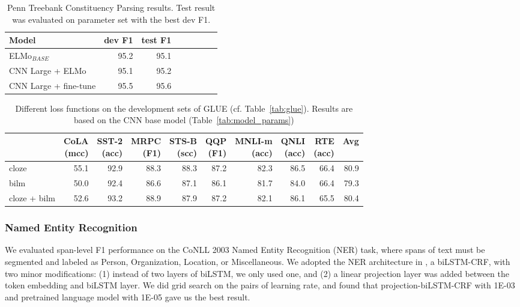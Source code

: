 \documentclass[11pt,a4paper]{article}
\begin{document}
\begin{table}[t]
\centering
\begin{tabular}{lrrrrrcr}
\toprule
\bf Model & \bf dev F1 & \bf test F1 \\ \midrule
ELMo$_{BASE}$ &  95.2 & 95.1  \\\midrule
CNN Large + ELMo & 95.1 & 95.2\\
CNN Large + fine-tune & 95.5 &95.6 \\
\bottomrule
\end{tabular}
\caption{Penn Treebank Constituency Parsing results. Test result was evaluated on parameter set with the best dev F1.}
\label{tab:parsing_results}
\end{table}


\begin{table*}
\centering
\begin{tabular}{lrrrrrrrrr}
\toprule
& \thead{CoLA\\(mcc)} & \thead{SST-2\\(acc)} & \thead{MRPC\\(F1)} & \thead{STS-B\\(scc)} & \thead{QQP\\(F1)} & \thead{MNLI-m\\(acc)} & \thead{QNLI\\(acc)} & \thead{RTE\\(acc)} & Avg \\
\midrule
cloze        & 55.1 & 92.9 & 88.3 & 88.3 & 87.2 & 82.3 & 86.5 & 66.4 & 80.9 \\
bilm         & 50.0 & 92.4 & 86.6 & 87.1 & 86.1 & 81.7 & 84.0 & 66.4 & 79.3 \\
cloze + bilm & 52.6 & 93.2 & 88.9 & 87.9 & 87.2 & 82.1 & 86.1 & 65.5 & 80.4 \\
\bottomrule
\end{tabular}
\caption{Different loss functions on the development sets of GLUE (cf. Table~\ref{tab:glue}). Results are based on the CNN base model (Table~\ref{tab:model_params})}
\label{tab:loss}
\end{table*}

\subsubsection{Named Entity Recognition}
\label{sec:ner}

We evaluated span-level F1 performance on the CoNLL 2003 Named Entity Recognition (NER) task, where spans of text must be segmented and labeled as Person, Organization, Location, or Miscellaneous.  We adopted the NER architecture in \citet{peters2018acl}, a biLSTM-CRF, with two minor modifications:  (1) instead of two layers of biLSTM, we only used one, and  (2) a linear projection layer was added between the token embedding and biLSTM layer. 
We did grid search on the pairs of learning rate, and found that projection-biLSTM-CRF with 1E-03 and pretrained language model with 1E-05 gave us the best result. 
\end{document}
